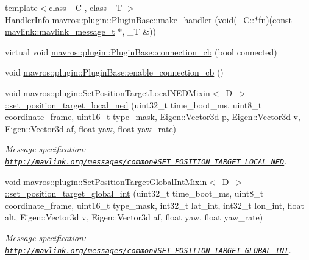\begin{DoxyCompactItemize}
\item 
{\footnotesize template$<$class \+\_\+C , class \+\_\+T $>$ }\\\mbox{\hyperlink{group__plugin_gab973eb02b8f26a7b2b9cea37924317f1}{Handler\+Info}} \mbox{\hyperlink{group__plugin_ga04a415508e82a7cc8ec15ce8a04eac5e}{mavros\+::plugin\+::\+Plugin\+Base\+::make\+\_\+handler}} (void(\+\_\+\+C\+::$\ast$fn)(const \mbox{\hyperlink{include__v0_89_2mavlink__types_8h_a63b963764c09dc72f4910c1521e325b9}{mavlink\+::mavlink\+\_\+message\+\_\+t}} $\ast$, \+\_\+T \&))
\item 
virtual void \mbox{\hyperlink{group__plugin_gadad2eaef432d01ad059a6edb40ab8443}{mavros\+::plugin\+::\+Plugin\+Base\+::connection\+\_\+cb}} (bool connected)
\item 
void \mbox{\hyperlink{group__plugin_ga7b437229a6cd8d15a1a5c5aaff31683e}{mavros\+::plugin\+::\+Plugin\+Base\+::enable\+\_\+connection\+\_\+cb}} ()
\item 
void \mbox{\hyperlink{group__plugin_ga9144d4820f4e4d8146c977ba81a59579}{mavros\+::plugin\+::\+Set\+Position\+Target\+Local\+N\+E\+D\+Mixin$<$ D $>$\+::set\+\_\+position\+\_\+target\+\_\+local\+\_\+ned}} (uint32\+\_\+t time\+\_\+boot\+\_\+ms, uint8\+\_\+t coordinate\+\_\+frame, uint16\+\_\+t type\+\_\+mask, Eigen\+::\+Vector3d \mbox{\hyperlink{velTest_8cpp_a739e18b8b6d072d434ebcb6ca486abb0}{p}}, Eigen\+::\+Vector3d v, Eigen\+::\+Vector3d af, float yaw, float yaw\+\_\+rate)
\begin{DoxyCompactList}\small\item\em Message specification\+: {\ttfamily \href{http://mavlink.org/messages/common\#SET_POSITION_TARGET_LOCAL_NED}{\texttt{ http\+://mavlink.\+org/messages/common\#\+S\+E\+T\+\_\+\+P\+O\+S\+I\+T\+I\+O\+N\+\_\+\+T\+A\+R\+G\+E\+T\+\_\+\+L\+O\+C\+A\+L\+\_\+\+N\+ED}}}. \end{DoxyCompactList}\item 
void \mbox{\hyperlink{group__plugin_ga6e107096694f2c4483c9578a1a93d085}{mavros\+::plugin\+::\+Set\+Position\+Target\+Global\+Int\+Mixin$<$ D $>$\+::set\+\_\+position\+\_\+target\+\_\+global\+\_\+int}} (uint32\+\_\+t time\+\_\+boot\+\_\+ms, uint8\+\_\+t coordinate\+\_\+frame, uint16\+\_\+t type\+\_\+mask, int32\+\_\+t lat\+\_\+int, int32\+\_\+t lon\+\_\+int, float alt, Eigen\+::\+Vector3d v, Eigen\+::\+Vector3d af, float yaw, float yaw\+\_\+rate)
\begin{DoxyCompactList}\small\item\em Message specification\+: {\ttfamily \href{http://mavlink.org/messages/common\#SET_POSITION_TARGET_GLOBAL_INT}{\texttt{ http\+://mavlink.\+org/messages/common\#\+S\+E\+T\+\_\+\+P\+O\+S\+I\+T\+I\+O\+N\+\_\+\+T\+A\+R\+G\+E\+T\+\_\+\+G\+L\+O\+B\+A\+L\+\_\+\+I\+NT}}}. \end{DoxyCompactList}\item 

\end{DoxyCompactItemize}
